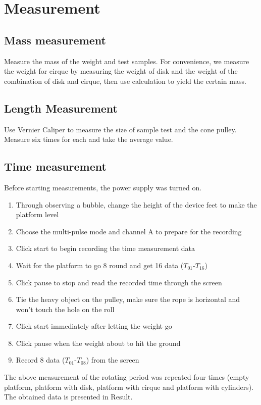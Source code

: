 \documentclass[12pt,a4paper]{article}
\begin{document}

\section{Measurement}

\subsection{Mass measurement}
Measure the mass of the weight and test samples. For convenience, we measure the weight for cirque by measuring the weight of disk 
and the weight of the combination of disk and cirque, then use calculation to yield the certain mass.

\subsection{Length Measurement}
Use Vernier Caliper to measure the size of sample test and the cone pulley. Measure six times for each and take the average value.

\subsection{Time measurement}
Before starting measurements, the power supply was turned on.
\begin{enumerate}
    \item  Through observing a bubble, change the height of the device feet to make the platform level
    \item  Choose the multi-pulse mode and channel A to prepare for the recording
    \item  Click start to begin recording the time measurement data
    \item  Wait for the platform to go 8 round and get 16 data ($T_{01}$-$T_{16}$)
    \item  Click pause to stop and read the recorded time through the screen
    \item  Tie the heavy object on the pulley, make sure the rope is horizontal and won't touch the hole on the roll
    \item  Click start immediately after letting the weight go
    \item Click pause when the weight about to hit the ground
    \item  Record 8 data ($T_{01}$-$T_{08}$) from the screen
\end{enumerate}\par
The above measurement of the rotating period was repeated four times (empty platform, platform with disk, platform with cirque and platform with cylinders). The obtained data is presented 
in Result.\par
\end{document}
